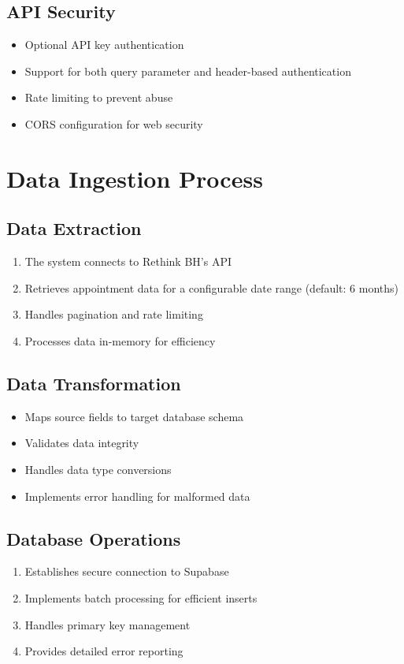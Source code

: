 \documentclass[11pt,a4paper]{article}
\begin{document}
\subsection{API Security}
\begin{itemize}
    \item Optional API key authentication
    \item Support for both query parameter and header-based authentication
    \item Rate limiting to prevent abuse
    \item CORS configuration for web security
\end{itemize}

\section{Data Ingestion Process}
\subsection{Data Extraction}
\begin{enumerate}
    \item The system connects to Rethink BH's API
    \item Retrieves appointment data for a configurable date range (default: 6 months)
    \item Handles pagination and rate limiting
    \item Processes data in-memory for efficiency
\end{enumerate}

\subsection{Data Transformation}
\begin{itemize}
    \item Maps source fields to target database schema
    \item Validates data integrity
    \item Handles data type conversions
    \item Implements error handling for malformed data
\end{itemize}

\subsection{Database Operations}
\begin{enumerate}
    \item Establishes secure connection to Supabase
    \item Implements batch processing for efficient inserts
    \item Handles primary key management
    \item Provides detailed error reporting
\end{enumerate}
\end{document}

